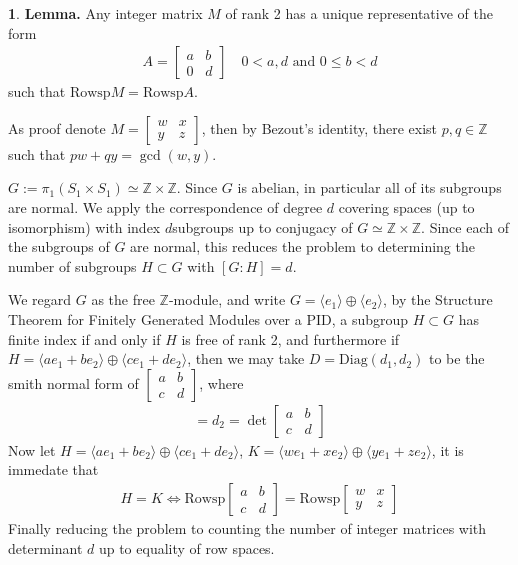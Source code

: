 \documentclass[10.5pt]{article}
\theoremstyle{definition}
\newtheorem{pb}{}
\newcommand{\gen}[1]{\langle #1 \rangle}
\newcommand{\tand}{\text{ and }}
\begin{document}
    \begin{pb}
        \textbf{Lemma.} Any integer matrix \(M\) of rank 2 has a unique representative of the form
        \begin{align*}
            A = \begin{bmatrix} a & b \\ 0 & d \end{bmatrix} \quad 0 < a, d \tand 0 \leq b < d
        \end{align*}
        such that \(\text{Rowsp}M = \text{Rowsp}A\).

        As proof denote \(M = \begin{bmatrix} w & x \\ y & z \end{bmatrix}\), then by Bezout's identity, there exist \(p,q \in \mathbb{Z}\) such that \(pw + qy = \gcd(w,y)\).

        \(G := \pi_1(S_1 \times S_1) \simeq \mathbb{Z} \times \mathbb{Z}\). Since \(G\) is abelian, in particular all of its subgroups are normal. We apply the correspondence of degree \(d\) covering spaces (up to isomorphism) with index \(d\)subgroups up to conjugacy of \(G \simeq \mathbb{Z} \times \mathbb{Z}\). Since each of the subgroups of \(G\) are normal, this reduces the problem to determining the number of subgroups \(H \subset G\) with \([G:H] = d\).

        We regard \(G\) as the free \(\mathbb{Z}\)-module, and write \(G = \gen{e_1} \oplus \gen{e_2}\), by the Structure Theorem for Finitely Generated Modules over a PID, a subgroup \(H \subset G\) has finite index if and only if \(H\) is free of rank 2, and furthermore if \(H = \gen{a e_1 + be_2} \oplus \gen{ce_1 + de_2}\), then we may take \(D = \text{Diag}(d_1,d_2)\) to be the smith normal form of
        \(\begin{bmatrix}a & b\\ c & d \end{bmatrix}\), where
        \begin{align*}
            [G:H] = d_2 = \det \begin{bmatrix}a & b\\ c & d \end{bmatrix}
        \end{align*}
        Now let \(H = \gen{a e_1 + be_2} \oplus \gen{ce_1 + de_2}\), \(K = \gen{we_1 + xe_2} \oplus \gen{ye_1 + ze_2}\), it is immedate that
        \begin{align*}
            H = K \iff \text{Rowsp}\begin{bmatrix}a & b\\ c & d \end{bmatrix} = \text{Rowsp}\begin{bmatrix}w & x\\ y & z \end{bmatrix}
        \end{align*}
        Finally reducing the problem to counting the number of integer matrices with determinant \(d\) up to equality of row spaces.
    \end{pb}
\end{document}
